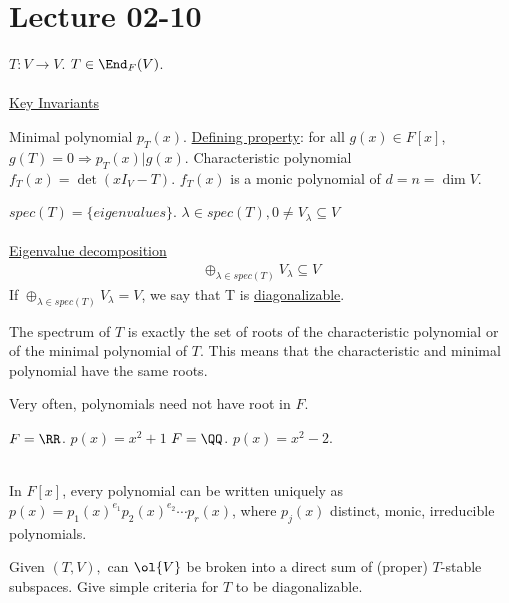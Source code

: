 \documentclass[class=scrartcl, crop=false]{standalone}
\date{2020-02-10}
\begin{document}
\section{Lecture 02-10}

$T: V \to V$. $T \in \End_F(V)$. 
\\\\
\ul{Key Invariants}
\begin{enumerate}
  \ii
  Minimal polynomial $p_T(x)$. \ul{Defining property}: for all $g(x) \in F[x]$, $g(T) = 0 \Rightarrow p_T(x) | g(x)$.
  \ii
  Characteristic polynomial $f_T(x) = \det(x I_V - T)$. $f_T(x)$ is a monic polynomial of $d = n = \dim V$.
\end{enumerate} 
$spec(T) = \{eigenvalues\}$. $\lambda \in spec(T), 0 \neq V_\lambda \subseteq V$
\\\\
\ul{Eigenvalue decomposition}
\begin{gather*}
  \oplus_{\lambda \in spec(T)}V_\lambda \subseteq V
\end{gather*} 
If $\oplus_{\lambda \in spec(T)}V_\lambda = V$, we say that T is \ul{diagonalizable}.

\begin{theorem}
  The spectrum of $T$ is exactly the set of roots of the characteristic polynomial or of the minimal polynomial of $T$. This means that the characteristic and minimal polynomial have the same roots.
\end{theorem} 

\begin{note}
  Very often, polynomials need not have root in $F$.
  \begin{example}
    \begin{enumerate}
      \ii
      $F = \RR$. $p(x) = x^2 + 1$
      \ii
      $F = \QQ$. $p(x) = x^2 - 2$.
    \end{enumerate} 
  \end{example} 
\end{note} \leavevmode \\
In $F[x]$, every polynomial can be written uniquely as $p(x) = p_1(x)^{e_1}p_2(x)^{e_2}\cdots p_r(x)$, where $p_j(x)$ distinct, monic, irreducible polynomials.
\begin{exercise}
  \begin{enumerate}
    \ii
    Given $(T, V),$ can $\ol{V}$ be broken into a direct sum of (proper) $T$-stable subspaces.
    \ii
    Give simple criteria for $T$ to be diagonalizable.
  \end{enumerate} 
\end{exercise} 
\end{document}
